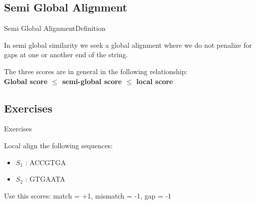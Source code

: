 \documentclass[10pt]{beamer}
\newcommand{\1}{
	\setbeamertemplate{background}{
		\texttt{[image: img/1]}
		\tikz[overlay] \fill[fill opacity=0.75,fill=white] (0,0) rectangle (-\paperwidth,\paperheight);
	}
}
\begin{document}
\subsection{Semi Global Alignment}

\begin{frame}{Semi Global Alignment}{Definition}	
	
	\begin{block}{}
	 In semi global similarity we seek a global alignment where we do not penalize for gaps at one or another end of the string.
	\end{block}

	\begin{block}{}
		The three scores are in general in the following relationship: \\
		\textbf{Global score $\leq$ semi-global score $\leq$ local score}
\end{block}
\end{frame}



\subsection{Exercises}

\begin{frame}{Exercises}	
	
	\begin{block}{}
		Local align the following sequences:
		\begin{itemize}
			\item $S_1$ : ACCGTGA
			\item $S_2$ : GTGAATA
		\end{itemize}
		Use this scores: match = +1, mismatch = -1, gap = -1	
	\end{block}
	
	
\end{frame}
\end{document}
